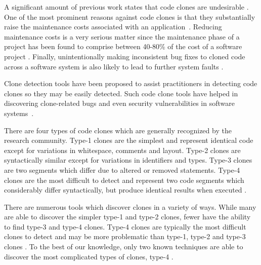 \documentclass[conference]{IEEEtran}
\begin{document}
A significant amount of previous work states that code clones are undesirable \cite{Mondal:2012:ESC:2387358.2387360} \cite{Duala-Ekoko:2010:CRD:1767751.1767754}. One of the most prominent reasons against code clones is that they substantially raise the maintenance costs associated with an application~\cite{Juergens:2009:CCM:1555001.1555062}. Reducing maintenance costs is a very serious matter since the maintenance phase of a project has been found to comprise between 40-80\% of the cost of a software project \cite{Shukla:2008:ESM:1342211.1342232} \cite{Ducasse:1999:LIA:519621.853389} \cite{SMR:SMR225} \cite{Ueda:2002:GMS:823457.824039}. Finally, unintentionally making inconsistent bug fixes to cloned code across a software system is also likely to lead to further system faults \cite{Deissenboeck_2010}. 


Clone detection tools have been proposed to assist practitioners in detecting code clones so they may be easily detected. Such code clone tools have helped in discovering clone-related bugs and even security vulnerabilities in software systems~\cite{Dang:2012:XTC:2420950.2421004}.

There are four types of code clones which are generally recognized by the research community. Type-1 clones are the simplest and represent identical code except for variations in whitespace, comments and layout. Type-2 clones are syntactically similar except for variations in identifiers and types. Type-3 clones are two segments which differ due to altered or removed statements. Type-4 clones are the most difficult to detect and represent two code segments which considerably differ syntactically, but produce identical results when executed \cite{Gold:2010:ICC:1808901.1808916}. 


There are numerous tools which discover clones in a variety of ways. While many are able to discover the simpler type-1 and type-2 clones, fewer have the ability to find type-3 and type-4 clones. Type-4 clones are typically the most difficult clones to detect and may be more problematic than type-1, type-2 and type-3 clones  \cite{Roy07asurvey}. To the best of our knowledge, only two known techniques are able to discover the most complicated types of clones, type-4 \cite{Roy:2009:CEC:1530898.1531101, Kraw2012}. 
\end{document}
